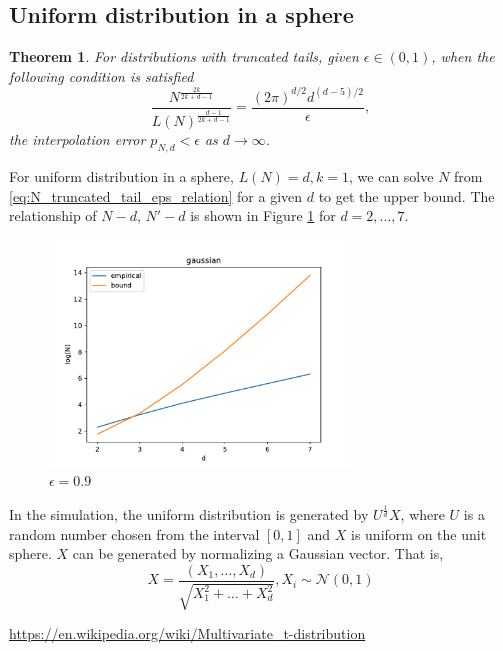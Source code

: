 \documentclass{article}
\newtheorem{theorem}{Theorem}
\begin{document}
\subsection{Uniform distribution in a sphere}
\begin{theorem}\label{thm:truncated_tails_sample}
    For distributions with truncated tails,
    given $\epsilon \in (0,1)$,
    when the following condition is satisfied
    \begin{equation}\label{eq:N_truncated_tail_eps_relation}
      \frac{N^{\frac{2k}{2k+d-1}}}{L(N)^{\frac{d-1}{2k+d-1}}} 
          =\frac{(2\pi)^{d/2}d^{(d-5)/2}}{\epsilon},
    \end{equation}
    the interpolation error $p_{N,d} < \epsilon$ as $d\to \infty$.
  \end{theorem}
For uniform distribution in a sphere, $L(N)=d, k=1$,
we can solve $N$ from \eqref{eq:N_truncated_tail_eps_relation}
for a given $d$ to get the upper bound.
The relationship of $N-d$, $N'-d$ is shown in
Figure \ref{fig:uniform} for $d=2,\dots, 7$.
\begin{figure}[!ht]
    \centering
    \includegraphics[width=8cm]{gaussian.pdf}
    \caption{$\epsilon=0.9$}\label{fig:uniform}
\end{figure}
In the simulation, the uniform distribution is generated by $U^{\frac{1}{d}}X$,
where $U$ is a random number chosen from the interval $[0, 1]$ and $X$ is uniform on the unit sphere.
$X$ can be generated by normalizing a Gaussian vector. That is,
\begin{equation}
    X = \frac{(X_1, \dots, X_d)}{\sqrt{X_1^2+\dots +X_d^2}}, X_i \sim \mathcal{N}(0,1)
\end{equation}

\begin{thebibliography}{9}
     \url{https://en.wikipedia.org/wiki/Multivariate_t-distribution}
\end{thebibliography}
\end{document}
